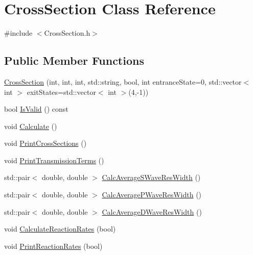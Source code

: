 \hypertarget{classCrossSection}{\section{Cross\-Section Class Reference}
\label{classCrossSection}
}


{\ttfamily \#include $<$Cross\-Section.\-h$>$}

\subsection*{Public Member Functions}
\begin{DoxyCompactItemize}
\item 
\hyperlink{classCrossSection_a1b6153b04abfedf530ec16b61a037675}{Cross\-Section} (int, int, int, std\-::string, bool, int entrance\-State=0, std\-::vector$<$ int $>$ exit\-States=std\-::vector$<$ int $>$(4,-\/1))
\item 
bool \hyperlink{classCrossSection_af9d7861a745a315774a300ad76b462e9}{Is\-Valid} () const 
\item 
void \hyperlink{classCrossSection_a7a9c110cc504c1e4a1dcfde56c1a9fc3}{Calculate} ()
\item 
void \hyperlink{classCrossSection_a63f9594f0d5bd585a782efd1194684e7}{Print\-Cross\-Sections} ()
\item 
void \hyperlink{classCrossSection_a92572bb7b0d827adf25f2d85406c3975}{Print\-Transmission\-Terms} ()
\item 
std\-::pair$<$ double, double $>$ \hyperlink{classCrossSection_a8f565b6ac64e6926e048cb616057c7fe}{Calc\-Average\-S\-Wave\-Res\-Width} ()
\item 
std\-::pair$<$ double, double $>$ \hyperlink{classCrossSection_ab8fcc59ed5ef9eaa09140b59b31f16f3}{Calc\-Average\-P\-Wave\-Res\-Width} ()
\item 
std\-::pair$<$ double, double $>$ \hyperlink{classCrossSection_ae910a6a04f52aa52065faf03f52a2af1}{Calc\-Average\-D\-Wave\-Res\-Width} ()
\item 
void \hyperlink{classCrossSection_a9fe40fbeeedbe85cb8723a5ecc9e6279}{Calculate\-Reaction\-Rates} (bool)
\item 
void \hyperlink{classCrossSection_a55f11cd4b1437a52014ac1e0527cac79}{Print\-Reaction\-Rates} (bool)
\end{DoxyCompactItemize}
